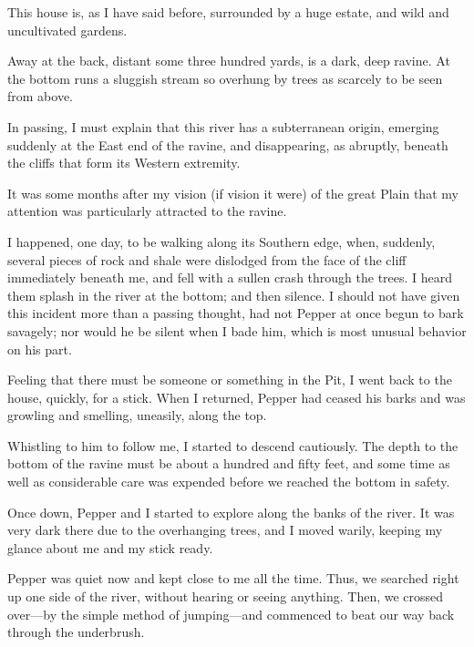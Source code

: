 
\clearpage
\label{ch:04}

\begin{ChapterStart}
\null\null
{}
\end{ChapterStart}

This house is, as I have said before, surrounded by a huge estate, and wild and uncultivated gardens.

Away at the back, distant some three hundred yards, is a dark, deep ravine. At the bottom runs a sluggish stream so overhung by trees as scarcely to be seen from above.

In passing, I must explain that this river has a subterranean origin, emerging suddenly at the East end of the ravine, and disappearing, as abruptly, beneath the cliffs that form its Western extremity.

It was some months after my vision (if vision it were) of the great Plain that my attention was particularly attracted to the ravine.

I happened, one day, to be walking along its Southern edge, when, suddenly, several pieces of rock and shale were dislodged from the face of the cliff immediately beneath me, and fell with a sullen crash through the trees. I heard them splash in the river at the bottom; and then silence. I should not have given this incident more than a passing thought, had not Pepper at once begun to bark savagely; nor would he be silent when I bade him, which is most unusual behavior on his part.

Feeling that there must be someone or something in the Pit, I went back to the house, quickly, for a stick. When I returned, Pepper had ceased his barks and was growling and smelling, uneasily, along the top.

Whistling to him to follow me, I started to descend cautiously. The depth to the bottom of the ravine must be about a hundred and fifty feet, and some time as well as considerable care was expended before we reached the bottom in safety.

Once down, Pepper and I started to explore along the banks of the river. It was very dark there due to the overhanging trees, and I moved warily, keeping my glance about me and my stick ready.

Pepper was quiet now and kept close to me all the time. Thus, we searched right up one side of the river, without hearing or seeing anything. Then, we crossed over---by the simple method of jumping---and commenced to beat our way back through the underbrush.

